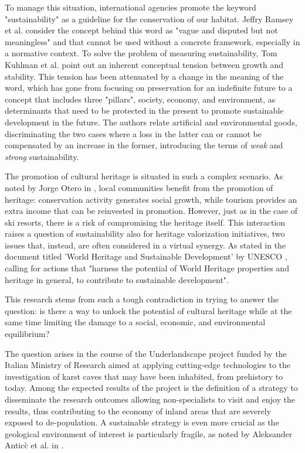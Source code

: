 \documentclass[sustainability,article,submit,pdftex,moreauthors]{Definitions/mdpi}
\begin{document}
To manage this situation, international agencies promote the keyword "sustainability" as a guideline for the conservation of our habitat. Jeffry Ramsey et al. \cite{ram15a} consider the concept behind this word as "vague and disputed but not meaningless" and that cannot be used without a concrete framework, especially in a normative context. To solve the problem of measuring sustainability, Tom Kuhlman et al. \cite{kuh10a} point out an inherent conceptual tension between growth and stability. This tension has been attenuated by a change in the meaning of the word, which has gone from focusing on preservation for an indefinite future to a concept that includes three "pillars", society, economy, and environment, as determinants that need to be protected in the present to promote sustainable development in the future. The authors relate artificial and environmental goods, discriminating the two cases where a loss in the latter can or cannot be compensated by an increase in the former, introducing the terms of {\em weak} and {\em strong} sustainability.

The promotion of cultural heritage is situated in such a complex scenario. As noted by Jorge Otero in \cite{ote22a}, local communities benefit from the promotion of heritage: conservation activity generates social growth, while tourism provides an extra income that can be reinvested in promotion. However, just as in the case of ski resorts, there is a risk of compromising the heritage itself. This interaction raises a question of sustainability also for heritage valorization initiatives, two issues that, instead,  are often considered in a virtual synergy. As stated in the document titled 'World Heritage and Sustainable Development' by UNESCO \cite{lab17a}, calling for actions that "harness the potential of World Heritage properties and heritage in general, to contribute to sustainable development".

This research stems from such a tough contradiction in trying to answer the question: is there a way to unlock the potential of cultural heritage while at the same time limiting the damage to a social, economic, and environmental equilibrium?

The question arises in the course of the Underlandscape project  funded by the Italian Ministry of Research aimed at applying cutting-edge technologies to the investigation of karst caves that may have been inhabited, from prehistory to today. Among the expected results of the project is the definition of a strategy to disseminate the research outcomes allowing non-specialists to visit and enjoy the results, thus contributing to the economy of inland areas that are severely exposed to de-population. A sustainable strategy is even more crucial as the geological environment of interest is particularly fragile, as noted by Aleksander Antic\`c et al. in \cite{ant20a}.
\end{document}
